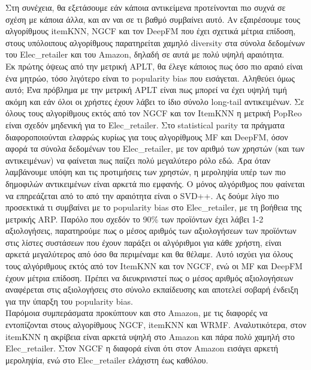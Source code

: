 \noindent Στη συνέχεια, θα εξετάσουμε εάν κάποια αντικείμενα προτείνονται πιο συχνά σε σχέση με κάποια άλλα, και αν ναι σε τι βαθμό συμβαίνει αυτό. Αν εξαιρέσουμε τους αλγορίθμους itemKNN, NGCF και τον DeepFM που έχει σχετικά μέτρια επίδοση, στους υπόλοιπους αλγορίθμους παρατηρείται χαμηλό diversity στα σύνολα δεδομένων του Elec\_retailer και του Amazon, δηλαδή σε αυτά με πολύ υψηλή αραιότητα. \\
Εκ πρώτης όψεως από την μετρική APLT, θα έλεγε κάποιος πως όσο πιο αραιό είναι ένα μητρώο, τόσο λιγότερο είναι το popularity bias που εισάγεται. Αληθεύει όμως αυτό;
Ένα πρόβλημα με την μετρική APLT είναι πως μπορεί να έχει υψηλή τιμή ακόμη και εάν όλοι οι χρήστες έχουν λάβει το ίδιο σύνολο long-tail αντικειμένων. 
Σε όλους τους αλγορίθμους εκτός από τον NGCF και τον ItemΚΝΝ η μετρική PopReo είναι σχεδόν μηδενική για το Elec\_retailer.
Στο statistical parity τα πράγματα διαφοροποιούνται ελαφρώς κυρίως για τους αλγορίθμους MF και DeepFM, όσον αφορά τα σύνολα δεδομένων του Elec\_retailer, με τον αριθμό των χρηστών (και των αντικειμένων) να φαίνεται πως παίζει πολύ μεγαλύτερο ρόλο εδώ.
Άρα όταν λαμβάνουμε υπόψη και τις προτιμήσεις των χρηστών, η μεροληψία υπέρ των πιο δημοφιλών αντικειμένων είναι αρκετά πιο εμφανής.
Ο μόνος αλγόριθμος που φαίνεται να επηρεάζεται από το από την αραιότητα είναι ο SVD++.
Ας δούμε λίγο πιο προσεκτικά τι συμβαίνει με το popularity bias στο Elec\_retailer, με τη βοήθεια της μετρικής ARP.
Παρόλο που σχεδόν το 90\% των προϊόντων έχει λάβει 1-2 αξιολογήσεις, παρατηρούμε πως ο μέσος αριθμός των αξιολογήσεων των προϊόντων στις λίστες συστάσεων που έχουν παράξει οι αλγόριθμοι για κάθε χρήστη, είναι αρκετά μεγαλύτερος από όσο θα περιμέναμε και θα θέλαμε. Αυτό ισχύει για όλους τους αλγόριθμους εκτός από τον ItemKNN και τον NGCF, ενώ οι MF και DeepFM έχουν μέτρια επίδοση. Πρέπει να διευκρινιστεί πως ο μέσος αριθμός αξιολογήσεων αναφέρεται στις αξιολογήσεις στο σύνολο εκπαίδευσης και αποτελεί σοβαρή ένδειξη για την ύπαρξη του popularity bias.\\
Παρόμοια συμπεράσματα προκύπτουν και στο Amazon, με τις διαφορές να εντοπίζονται στους αλγορίθμους NGCF, itemKNN και WRMF. Αναλυτικότερα, στον itemKNN η ακρίβεια είναι αρκετά υψηλή στο Amazon και πάρα πολύ χαμηλή στο Elec\_retailer. Στον NGCF η διαφορά είναι ότι στον Amazon εισάγει αρκετή μεροληψία, ενώ στο Elec\_retailer ελάχιστη έως καθόλου.


